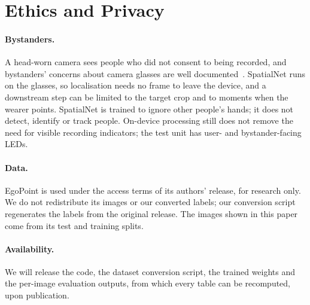 \section{Ethics and Privacy}\label{sec:ethics}

\paragraph{Bystanders.} A head-worn camera sees people who did not consent to being recorded, and bystanders' concerns about camera glasses are well documented~\cite{denning2014situ,hoyle2014privacy}. SpatialNet runs on the glasses, so localisation needs no frame to leave the device, and a downstream step can be limited to the target crop and to moments when the wearer points. SpatialNet is trained to ignore other people's hands; it does not detect, identify or track people. On-device processing still does not remove the need for visible recording indicators; the test unit has user- and bystander-facing LEDs.

\paragraph{Data.} EgoPoint is used under the access terms of its authors' release, for research only. We do not redistribute its images or our converted labels; our conversion script regenerates the labels from the original release. The images shown in this paper come from its test and training splits. 

\paragraph{Availability.} We will release the code, the dataset conversion script, the trained weights and the per-image evaluation outputs, from which every table can be recomputed, upon publication.

